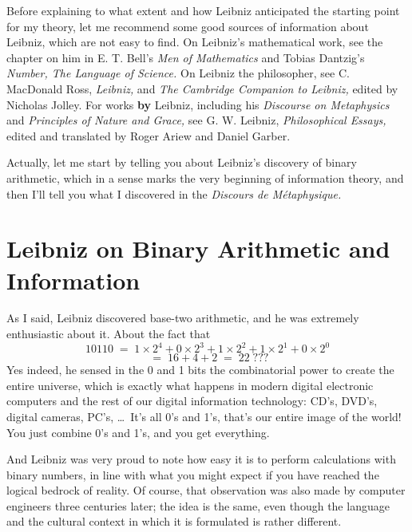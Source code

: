 \documentclass[12pt]{book}
\begin{document}
Before explaining to what extent and how Leibniz anticipated the starting point for my theory,
let me recommend some good sources of information about Leibniz, which are not
easy to find.  On Leibniz's mathematical work, see the chapter on him
in E. T. Bell's \emph{Men of Mathematics} and Tobias Dantzig's \emph{Number, The Language of
Science.} 
On Leibniz the philosopher, see C. MacDonald Ross, \emph{Leibniz,}   
and
\emph{The Cambridge Companion to Leibniz,}
edited by Nicholas Jolley. 
For works \textbf{by} Leibniz, including his \emph{Discourse on Metaphysics}
and \emph{Principles of Nature and Grace,}
see
G. W. Leibniz, \emph{Philosophical Essays,} 
edited and translated by Roger Ariew and Daniel Garber.
 
Actually, let me start by telling you about Leibniz's discovery of binary
arithmetic, which in a sense marks the very beginning of information theory,
and then I'll tell you what I discovered in the \emph{Discours de M\'etaphysique.}

\section*{Leibniz on Binary Arithmetic and Information}

As I said, Leibniz discovered base-two arithmetic, and he was extremely enthusiastic
about it.  About the fact that
\[
 10110 \; = \; 1 \times 2^4
 + 0 \times 2^3
 + 1 \times 2^2
 + 1 \times 2^1
 + 0 \times 2^0
\]
\[
 \; = \; 16 + 4 + 2
 \; = \; 22 \; ???
\] 
Yes indeed, he sensed in the 0 and 1 bits the 
combinatorial power to create the entire universe, which is
exactly what happens in modern digital electronic computers and the rest of our
digital information technology: CD's, DVD's, digital cameras, PC's, \ldots\
It's all 0's and 1's, that's our entire image of the world!
You just combine 0's and 1's, and you get everything.
 
And Leibniz was very proud to note how easy it is to perform calculations with binary
numbers, in line with what you might expect if you have reached the logical bedrock
of reality.  Of course, that observation was also made by computer engineers three
centuries later; the idea is the same, even though the language and the cultural 
context in which it is formulated is rather different.
 
\end{document}
